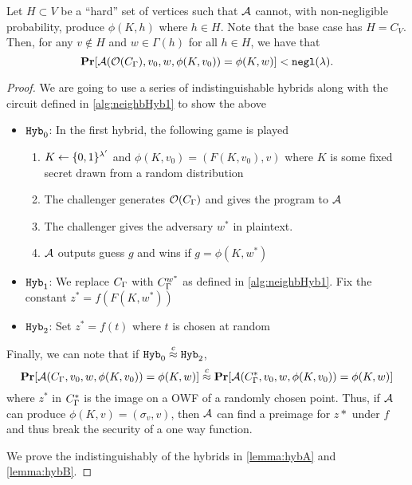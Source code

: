 \begin{lemma}
	Let $H \subset V$ be a ``hard'' set of vertices such that $\mathcal{A}$ cannot, with non-negligible probability, produce 
	$\phi(K, h)$ where $h \in H$. Note that the base case has $H = C_V$. Then, 
	for any $v \notin H$ and $w \in \Gamma(h)$ for all $h \in H$, we have that
	\begin{equation*}
		\operatorname*{\mathbf{Pr}}[\mathcal{A}(\mathcal{O}(C_\Gamma), v_0, w, \phi(K, v_0)) = \phi(K, w)] < \texttt{negl}(\lambda).
	\end{equation*}
	\begin{proof}
		We are going to use a series of indistinguishable hybrids along with the circuit defined in \ref{alg:neighbHyb1} to show the above
		\begin{itemize}
			\item $\texttt{Hyb}_0$: In the first hybrid, the following game is played
				\begin{enumerate}
					\item $K \gets \{0,1\}^{\lambda'}$ and $\phi(K, v_0) = (F(K, v_0), v)$ where $K$ is some fixed secret drawn from a random distribution
					\item The challenger generates $\mathcal{O}(C_\Gamma)$ and gives the program to $\mathcal{A}$
					\item The challenger gives the adversary $w^*$ in plaintext.
					\item $\mathcal{A}$ outputs guess $g$ and wins if $g = \phi(K, w^*)$ %
				\end{enumerate}
			
			\item $\texttt{Hyb}_1$: We replace $C_\Gamma$ with $C_\Gamma^{w^*}$ as defined in \ref{alg:neighbHyb1}.
			Fix the constant $z^* = f(F(K, w^*))$

			\item $\texttt{Hyb}_2$: Set $z^* = f(t)$ where $t$ is chosen at random %
		\end{itemize}
		Finally, we can note that if $\texttt{Hyb}_0 \overset{c}{\approx} \texttt{Hyb}_2$,
		\begin{equation*}
			\operatorname*{\mathbf{Pr}}[\mathcal{A}(C_\Gamma, v_0, w, \phi(K, v_0)) = \phi(K, w)] 
			\overset{c}{\approx}
			\operatorname*{\mathbf{Pr}}[\mathcal{A}(C_\Gamma^*, v_0, w, \phi(K, v_0)) = \phi(K, w)]
		\end{equation*}
		where $z^*$ in $C_\Gamma^*$	is the image on a OWF of a randomly chosen point.
		Thus, if $\mathcal{A}$ can produce $\phi(K, v) = (\sigma_v, v)$, then $\mathcal{A}$
		can find a preimage for $z*$ under $f$ and thus break the security of a one way function.

		We prove the indistinguishably of the hybrids in \cref{lemma:hybA} and \cref{lemma:hybB}.
	\end{proof}
\end{lemma}

